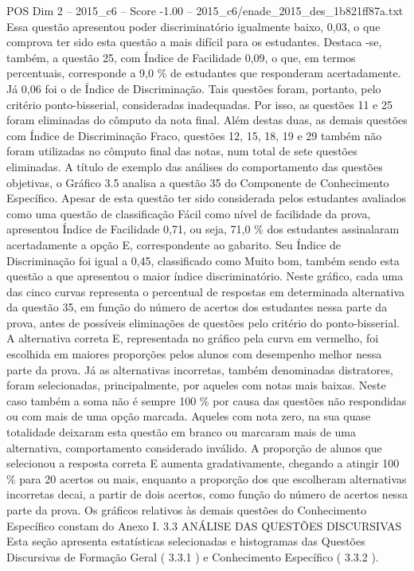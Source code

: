 \begin{textsample}{POS Dim 2 – 2015\_c6 – Score -1.00 – 2015\_c6/enade\_2015\_des\_1b821ff87a.txt}
Essa questão apresentou poder discriminatório igualmente baixo, 0,03, o que comprova ter sido esta questão a mais difícil para os estudantes.
Destaca -se, também, a questão 25, com Índice de Facilidade 0,09, o que, em termos percentuais, corresponde a 9,0 \% de estudantes que responderam acertadamente.
Já 0,06 foi o de Índice de Discriminação.
Tais questões foram, portanto, pelo critério ponto-bisserial, consideradas inadequadas.
Por isso, as questões 11 e 25 foram eliminadas do cômputo da nota final.
Além destas duas, as demais questões com Índice de Discriminação Fraco, questões 12, 15, 18, 19 e 29 também não foram utilizadas no cômputo final das notas, num total de sete questões eliminadas.
A título de exemplo das análises do comportamento das questões objetivas, o Gráfico 3.5 analisa a questão 35 do Componente de Conhecimento Específico.
Apesar de esta questão ter sido considerada pelos estudantes avaliados como uma questão de classificação Fácil como nível de facilidade da prova, apresentou Índice de Facilidade 0,71, ou seja, 71,0 \% dos estudantes assinalaram acertadamente a opção E, correspondente ao gabarito.
Seu Índice de Discriminação foi igual a 0,45, classificado como Muito bom, também sendo esta questão a que apresentou o maior índice discriminatório.
Neste gráfico, cada uma das cinco curvas representa o percentual de respostas em determinada alternativa da questão 35, em função do número de acertos dos estudantes nessa parte da prova, antes de possíveis eliminações de questões pelo critério do ponto-bisserial.
A alternativa correta E, representada no gráfico pela curva em vermelho, foi escolhida em maiores proporções pelos alunos com desempenho melhor nessa parte da prova.
Já as alternativas incorretas, também denominadas distratores, foram selecionadas, principalmente, por aqueles com notas mais baixas.
Neste caso também a soma não é sempre 100 \% por causa das questões não respondidas ou com mais de uma opção marcada.
Aqueles com nota zero, na sua quase totalidade deixaram esta questão em branco ou marcaram mais de uma alternativa, comportamento considerado inválido.
A proporção de alunos que selecionou a resposta correta E aumenta gradativamente, chegando a atingir 100 \% para 20 acertos ou mais, enquanto a proporção dos que escolheram alternativas incorretas decai, a partir de dois acertos, como função do número de acertos nessa parte da prova.
Os gráficos relativos às demais questões do Conhecimento Específico constam do Anexo I. 3.3 ANÁLISE DAS QUESTÕES DISCURSIVAS Esta seção apresenta estatísticas selecionadas e histogramas das Questões Discursivas de Formação Geral ( 3.3.1 ) e Conhecimento Específico ( 3.3.2 ).

\end{textsample}
